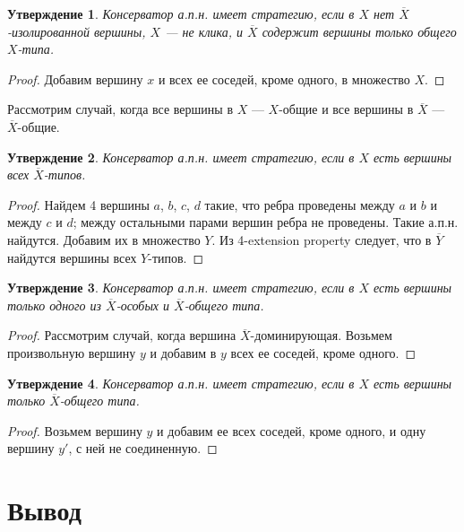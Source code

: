 \documentclass{article}
\newtheorem*{sttm}{Утверждение}
\begin{document}
	\begin{sttm}
		Консерватор а.п.н. имеет стратегию, если в $X$ нет $\overline{X}$-изолированной вершины, $X$ --- не клика, и $\overline{X}$ содержит вершины только общего $X$-типа.
	\end{sttm}
	
	\begin{proof}
		Добавим вершину $x$ и всех ее соседей, кроме одного, в множество $X$.
	\end{proof}
	
	Рассмотрим случай, когда все вершины в $X$ --- $X$-общие и все вершины в $\overline{X}$ --- $\overline{X}$-общие.	
	
	\begin{sttm}
		Консерватор а.п.н. имеет стратегию, если в $X$ есть вершины всех $\overline{X}$-типов.
	\end{sttm}
	
	\begin{proof}
		Найдем 4 вершины $a$, $b$, $c$, $d$ такие, что ребра проведены между $a$ и $b$ и между $c$ и $d$; между остальными парами вершин ребра не проведены. Такие а.п.н. найдутся. Добавим их в множество $Y$. Из 4-extension property следует, что в $\overline{Y}$ найдутся вершины всех $Y$-типов.
	\end{proof}
	
	\begin{sttm}
		Консерватор а.п.н. имеет стратегию, если в $X$ есть вершины только одного из $\overline{X}$-особых и $\overline{X}$-общего типа.
	\end{sttm}
	
	\begin{proof}
		Рассмотрим случай, когда вершина $\overline{X}$-доминирующая. Возьмем произвольную вершину $y$ и добавим в $y$ всех ее соседей, кроме одного.
	\end{proof}
	
	\begin{sttm}
		Консерватор а.п.н. имеет стратегию, если в $X$ есть вершины только $\overline{X}$-общего типа.
	\end{sttm}
	
	\begin{proof}
		Возьмем вершину $y$ и добавим ее всех соседей, кроме одного, и одну вершину $y'$, с ней не соединенную.
	\end{proof}
	
	\section{Вывод}
	
\end{document}
